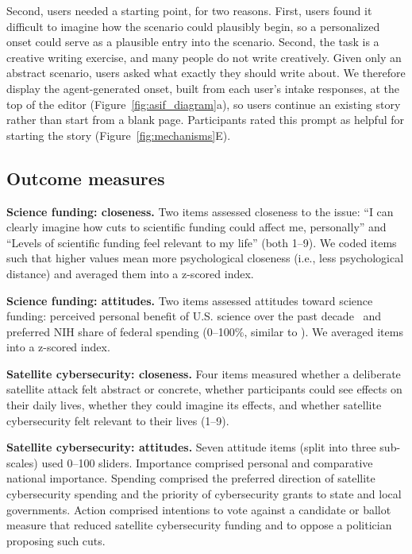 \documentclass[11pt]{article}
\begin{document}
Second, users needed a starting point, for two reasons. First, users found it difficult to imagine how the scenario could plausibly begin, so a personalized onset could serve as a plausible entry into the scenario. Second, the task is a creative writing exercise, and many people do not write creatively. Given only an abstract scenario, users asked what exactly they should write about. We therefore display the agent-generated onset, built from each user's intake responses, at the top of the editor (Figure~\ref{fig:asif_diagram}a), so users continue an existing story rather than start from a blank page. Participants rated this prompt as helpful for starting the story (Figure~\ref{fig:mechanisms}E).

\subsection{Outcome measures}
\label{sec:methods-outcome-measures}

\textbf{Science funding: closeness.} Two items assessed closeness to the issue: ``I can clearly imagine how cuts to scientific funding could affect me, personally'' and ``Levels of scientific funding feel relevant to my life'' (both 1--9). We coded items such that higher values mean more psychological closeness (i.e., less psychological distance) and averaged them into a z-scored index.

\textbf{Science funding: attitudes.} Two items assessed attitudes toward science funding: perceived personal benefit of U.S. science over the past decade~\citep[1--5; adapted from][]{ophir_effects_2021} and preferred NIH share of federal spending (0--100\%, similar to \cite{goldfarb_building_2017}). We averaged items into a z-scored index.

\textbf{Satellite cybersecurity: closeness.} Four items measured whether a deliberate satellite attack felt abstract or concrete, whether participants could see effects on their daily lives, whether they could imagine its effects, and whether satellite cybersecurity felt relevant to their lives (1--9).

\textbf{Satellite cybersecurity: attitudes.} Seven attitude items (split into three sub-scales) used 0--100 sliders. Importance comprised personal and comparative national importance. Spending comprised the preferred direction of satellite cybersecurity spending and the priority of cybersecurity grants to state and local governments. Action comprised intentions to vote against a candidate or ballot measure that reduced satellite cybersecurity funding and to oppose a politician proposing such cuts.
\end{document}
